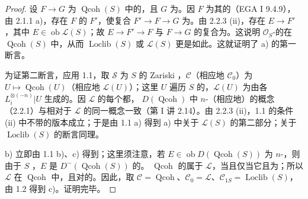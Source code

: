 \begin{proof}
设 $F\to G$ 为 $\operatorname{Qcoh}(S)$ 中的，且 $G$ 为。因 $F$ 为其的（EGA I 9.4.9），由 2.1.1 a)，存在 $F$ 的 $F'$，使复合 $F'\to F\to G$ 为。由 2.2.3 (ii)，存在 $E\to F'$，其中 $E\in\operatorname{ob}\mathcal L(S)$；故 $E\to F'\to F$ 与 $F\to G$ 的复合为。这说明 $\mathcal O_S$-的在 $\operatorname{Qcoh}(S)$ 中，从而 $\operatorname{Loclib}(S)$ 或 $\mathcal L(S)$ 更是如此。这就证明了 a) 的第一断言。

为证第二断言，应用 1.1，取 $\mathcal S$ 为 $S$ 的 Zariski ，$\mathcal C$（相应地 $\mathcal C_0$）为 $U\mapsto\operatorname{Qcoh}(U)$（相应地 $\mathcal L(U)$）；这里 $U$ 遍历 $S$ 的，$\mathcal L(U)$ 为由各 $L_i^{\otimes(-n)}|U$ 生成的。因 $\mathcal L$ 的每个都， $D(\operatorname{Qcoh})$ 中 $n$-（相应地）的概念（2.2.1）与相对于 $\mathcal L$ 的同一概念一致（第 I 讲 2.14）。由 2.2.3 (ii)，1.1 的条件 (ii) 中不带的版本成立；于是由 1.1 a) 得到 a) 中关于 $\mathcal L(S)$ 的第二部分；关于 $\operatorname{Loclib}(S)$ 的断言同理。

b) 立即由 1.1 b)、c) 得到；这里须注意，若 $E\in\operatorname{ob}D(\operatorname{Qcoh}(S))$ 为 $n$-，则由于 $S$ ，$E$ 是 $D^-(\operatorname{Qcoh}(S))$ 的。 $\operatorname{Qcoh}$ 的属于 $\mathcal L$，当且仅当它且为；所以 $\mathcal L$ 在 $\operatorname{Qcoh}$ 中，且对的。因此，取 $\mathcal C=\operatorname{Qcoh}$、$\mathcal C_0=\mathcal L$、$\mathcal C_{1S}=\operatorname{Loclib}(S)$，由 1.2 得到 c)。证明完毕。
\end{proof}
